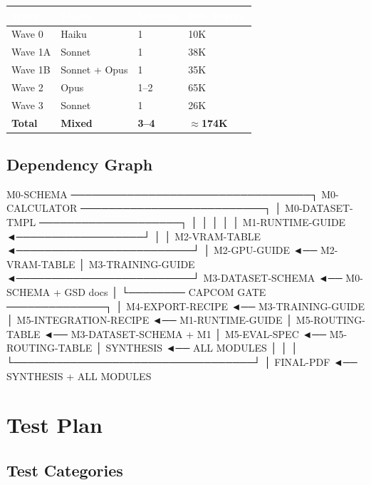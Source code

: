 \documentclass[11pt,letterpaper]{article}
\newcommand{\tableheader}[1]{\textbf{\sffamily\textcolor{white}{#1}}}
\begin{document}
\begin{center}
\begin{tabularx}{\textwidth}{L{4cm}C{2cm}C{2cm}C{2.5cm}}
\toprule
{}
\tableheader{Wave} & \tableheader{Model} & \tableheader{Sessions} & \tableheader{Est. Tokens} \\
\midrule
Wave 0 & Haiku & 1 & 10K \\
Wave 1A & Sonnet & 1 & 38K \\
Wave 1B & Sonnet + Opus & 1 & 35K \\
Wave 2 & Opus & 1--2 & 65K \\
Wave 3 & Sonnet & 1 & 26K \\
\midrule
{}
\textbf{Total} & \textbf{Mixed} & \textbf{3--4} & \textbf{$\approx$174K} \\
\bottomrule
\end{tabularx}
\end{center}

\subsection{Dependency Graph}

\begin{asciibox}
  M0-SCHEMA ──────────────────────────────────┐
  M0-CALCULATOR ──────────────────────────┐   │
  M0-DATASET-TMPL ────────────────────┐   │   │
                                      │   │   │
  M1-RUNTIME-GUIDE ◄──────────────────┘   │   │
  M2-VRAM-TABLE ◄─────────────────────────┘   │
  M2-GPU-GUIDE ◄── M2-VRAM-TABLE             │
  M3-TRAINING-GUIDE ◄─────────────────────────┘
  M3-DATASET-SCHEMA ◄── M0-SCHEMA + GSD docs
           │
           └──────── CAPCOM GATE ──────────────┐
                                               │
  M4-EXPORT-RECIPE ◄── M3-TRAINING-GUIDE      │
  M5-INTEGRATION-RECIPE ◄── M1-RUNTIME-GUIDE  │
  M5-ROUTING-TABLE ◄── M3-DATASET-SCHEMA + M1 │
  M5-EVAL-SPEC ◄── M5-ROUTING-TABLE           │
  SYNTHESIS ◄── ALL MODULES                   │
           │                                  │
           └──────────────────────────────────┘
           │
  FINAL-PDF ◄── SYNTHESIS + ALL MODULES
\end{asciibox}

\section{Test Plan}

\subsection{Test Categories}
\end{document}
